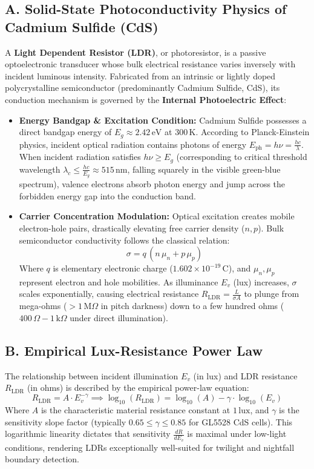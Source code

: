 \documentclass[10pt,a4paper]{article}
\begin{document}
\subsection*{A. Solid-State Photoconductivity Physics of Cadmium Sulfide (CdS)}
A \textbf{Light Dependent Resistor (LDR)}, or photoresistor, is a passive optoelectronic transducer whose bulk electrical resistance varies inversely with incident luminous intensity. Fabricated from an intrinsic or lightly doped polycrystalline semiconductor (predominantly Cadmium Sulfide, CdS), its conduction mechanism is governed by the \textbf{Internal Photoelectric Effect}:
\begin{itemize}[noitemsep]
    \item \textbf{Energy Bandgap \& Excitation Condition:} Cadmium Sulfide possesses a direct bandgap energy of $E_g \approx 2.42\,\text{eV}$ at $300\,\text{K}$. According to Planck-Einstein physics, incident optical radiation contains photons of energy $E_{\text{ph}} = h\nu = \frac{hc}{\lambda}$. When incident radiation satisfies $h\nu \ge E_g$ (corresponding to critical threshold wavelength $\lambda_c \le \frac{hc}{E_g} \approx 515\,\text{nm}$, falling squarely in the visible green-blue spectrum), valence electrons absorb photon energy and jump across the forbidden energy gap into the conduction band.
    \item \textbf{Carrier Concentration Modulation:} Optical excitation creates mobile electron-hole pairs, drastically elevating free carrier density ($n, p$). Bulk semiconductor conductivity follows the classical relation:
    \begin{equation}
    \sigma = q\,(n\,\mu_n + p\,\mu_p)
    \end{equation}
    Where $q$ is elementary electronic charge ($1.602 \times 10^{-19}\,\text{C}$), and $\mu_n, \mu_p$ represent electron and hole mobilities. As illuminance $E_v$ (lux) increases, $\sigma$ scales exponentially, causing electrical resistance $R_{\text{LDR}} = \frac{L}{\sigma A}$ to plunge from mega-ohms ($> 1\,\text{M}\Omega$ in pitch darkness) down to a few hundred ohms ($400\,\Omega - 1\,\text{k}\Omega$ under direct illumination).
\end{itemize}

\subsection*{B. Empirical Lux-Resistance Power Law}
The relationship between incident illumination $E_v$ (in lux) and LDR resistance $R_{\text{LDR}}$ (in ohms) is described by the empirical power-law equation:
\begin{equation}
R_{\text{LDR}} = A \cdot E_v^{-\gamma} \implies \log_{10}(R_{\text{LDR}}) = \log_{10}(A) - \gamma \cdot \log_{10}(E_v)
\end{equation}
Where $A$ is the characteristic material resistance constant at $1\,\text{lux}$, and $\gamma$ is the sensitivity slope factor (typically $0.65 \le \gamma \le 0.85$ for GL5528 CdS cells). This logarithmic linearity dictates that sensitivity $\frac{dR}{dE_v}$ is maximal under low-light conditions, rendering LDRs exceptionally well-suited for twilight and nightfall boundary detection.
\end{document}
